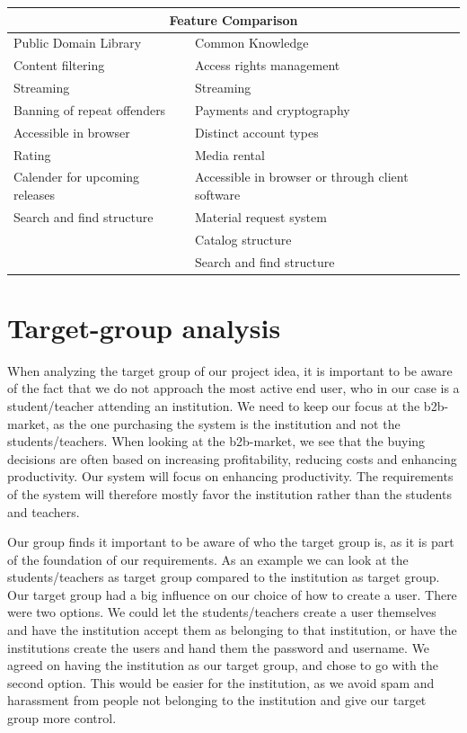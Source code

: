 \documentclass[10pt,a4paper]{article}
\begin{document}
\begin{tabularx}{\textwidth} {|X|X|}
\hline
\multicolumn{2}{|c|}{{\bfseries Feature Comparison}}\\
\hline
Public Domain Library & Common Knowledge \\
\hline
Content filtering & Access rights management \\
Streaming & Streaming\\
Banning of repeat offenders & Payments and cryptography\\
Accessible in browser & Distinct account types\\
Rating & Media rental\\
Calender for upcoming releases& Accessible in browser or through client software\\
Search and find structure & Material request system \\
& Catalog structure\\
& Search and find structure\\
\hline
\end{tabularx}

\section{Target-group analysis}
When analyzing the target group of our project idea, it is important to be aware of the fact that we do not approach the most active end user, who in our case is a student/teacher attending an institution. We need to keep our focus at the b2b-market, as the one purchasing the system is the institution and not the students/teachers. When looking at the b2b-market, we see that the buying decisions are often based on increasing profitability, reducing costs and enhancing productivity. Our system will focus on enhancing productivity. The requirements of the system will therefore mostly favor the institution rather than the students and teachers. 

Our group finds it important to be aware of who the target group is, as it is part of the foundation of our requirements. As an example we can look at the students/teachers as target group compared to the institution as target group. Our target group had a big influence on our choice of how to create a user. There were two options. We could let the students/teachers create a user themselves and have the institution accept them as belonging to that institution, or have the institutions create the users and hand them the password and username.
We agreed on having the institution as our target group, and chose to go with the second option. This would be easier for the institution, as we avoid spam and harassment from people not belonging to the institution and give our target group more control.
\end{document}
